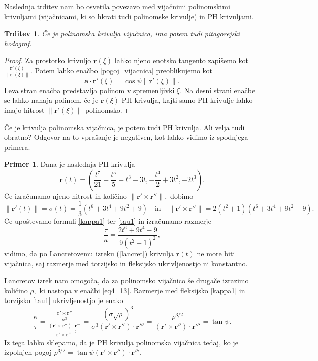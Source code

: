 \documentclass[12pt,a4paper,twoside]{article}
\theoremstyle{definition} %
\newtheorem{primer}[definicija]{Primer}
\theoremstyle{plain} %
\newtheorem{trditev}[definicija]{Trditev}
\numberwithin{equation}{section}  %
\newcommand{\fleksija}{\frac{\lVert \mathbf{r}'\times\mathbf{r}'' \rVert}{\sigma^3}}
\newcommand{\torzija}{\frac{(\mathbf{r}'\times\mathbf{r}'')\cdot\mathbf{r}'''}{\lVert \mathbf{r}'\times\mathbf{r}'' \rVert^2}}
\newcommand{\aV}{\mathbf{a}}
\newcommand{\rV}{\mathbf{r}}
\begin{document}
Naslednja trditev nam bo osvetila povezavo med vijačnimi polinomskimi krivuljami (vijačnicami, ki so hkrati tudi polinomske krivulje) in PH krivuljami.\cite{faroukietal2004}
\begin{trditev}
	\label{trditev_vijacnica_PH}
	Če je polinomska krivulja vijačnica, ima potem tudi pitagorejski hodograf.
\end{trditev}
\begin{proof}
	Za prostorko krivuljo $\rV(\xi)$ lahko njeno enotsko tangento zapišemo kot $\frac{\rV'(\xi)}{\lVert \rV'(\xi) \rVert}.$ Potem lahko enačbo \eqref{pogoj_vijacnica} preoblikujemo kot
	\begin{equation}
		\aV \cdot \rV'(\xi)=\cos \psi \lVert \rV'(\xi) \rVert.
	\end{equation}
	Leva stran enačba predstavlja polinom v spremenljivki $\xi.$ Na desni strani enačbe se lahko nahaja polinom, če je $\rV(\xi)$ PH krivulja, kajti samo PH krivulje lahko imajo hitrost $\lVert \rV'(\xi) \rVert$ polinomsko.
\end{proof}
Če je krivulja polinomska vijačnica, je potem tudi PH krivulja. Ali velja tudi obratno? Odgovor na to vprašanje je negativen, kot lahko vidimo iz spodnjega primera.\cite{beltranmonterde}
\begin{primer}
	\label{PH_ne_vijacnica}
	Dana je naslednja PH krivulja
	\begin{equation*}
		\rV(t)=\left ( \frac{t^7}{21}+\frac{t^5}{5}+t^3-3t,-\frac{t^4}{2}+3t^2,-2t^3 \right ).
	\end{equation*}
	Če izračunamo njeno hitrost in količino $\lVert \rV' \times \rV'' \rVert,$ dobimo
	\begin{equation*}
		\lVert \rV'(t) \rVert=\sigma(t)=\frac{1}{3}(t^6+3t^4+9t^2+9) \quad \text{in} \quad \lVert \rV' \times \rV'' \rVert=2(t^2+1)(t^6+3t^4+9t^2+9).
	\end{equation*}
	Če upoštevamo formuli \eqref{kappa1} ter \eqref{tau1} in izračunamo razmerje
	\begin{equation*}
		\frac{\tau}{\kappa}=\frac{2t^6+9t^4-9}{9(t^2+1)^2},
	\end{equation*}
	vidimo, da po Lancretovemu izreku (\ref{lancret}) krivulja $\rV(t)$ ne more biti vijačnica, saj razmerje med torzijsko in fleksijsko ukrivljenostjo ni konstantno.
\end{primer}

Lancretov izrek nam omogoča, da za polinomsko vijačnico še drugače izrazimo količino $\rho,$ ki nastopa v enačbi \eqref{eq4_13}. Razmerje med fleksijsko \eqref{kappa1} in torzijsko \eqref{tau1} ukrivljenostjo je enako
\begin{equation}
	\label{rho3over2}
	\frac{\kappa}{\tau}=\frac{\fleksija}{\torzija}=\frac{(\sigma \sqrt{\rho})^3}{\sigma^3(\rV'\times\rV'')\cdot\rV'''}=\frac{\rho^{3/2}}{(\rV'\times\rV'')\cdot\rV'''}=\tan \psi.
\end{equation}
Iz tega lahko sklepamo, da je PH krivulja polinomska vijačnica tedaj, ko je izpolnjen pogoj $\rho^{3/2}=\tan \psi (\rV'\times\rV'')\cdot\rV'''.$
\end{document}
